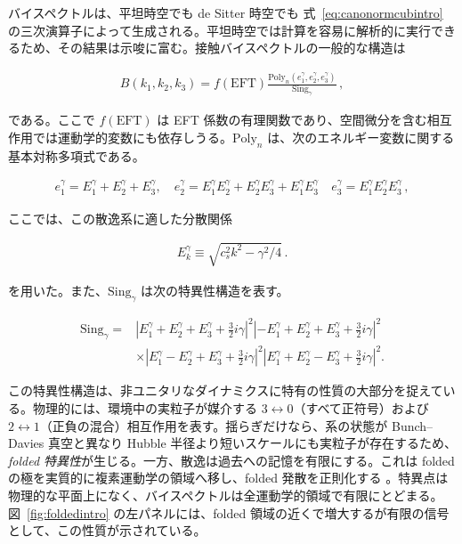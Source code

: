 \documentclass[a4paper,11pt]{ltjsarticle}
\numberwithin{equation}{section}
\newcommand{\Eq}[1]{Eq.~(\ref{#1})}
\newcommand{\Fig}[1]{Fig.~{\ref{#1}}}
\renewcommand{\Eq}[1]{式~\eqref{#1}}
\renewcommand{\Fig}[1]{図~\ref{#1}}
\begin{document}
バイスペクトルは、平坦時空でも de Sitter 時空でも \Eq{eq:canonormcubintro} の三次演算子によって生成される。平坦時空では計算を容易に解析的に実行できるため、その結果は示唆に富む。接触バイスペクトルの一般的な構造は

\begin{align}\label{eq:genintro}
B(k_1,k_2,k_3) =f(\mathrm{EFT}) \frac{  \mathrm{Poly}_n\left(e_1^\gamma, e_2^\gamma,e_3^\gamma \right)}{ \mathrm{Sing}_\gamma} \,,
\end{align}

である。ここで $f(\mathrm{EFT})$ は EFT 係数の有理関数であり、空間微分を含む相互作用では運動学的変数にも依存しうる。$\mathrm{Poly}_n$ は、次のエネルギー変数に関する基本対称多項式である。

\begin{align}\label{eq:varintro}
e_1^\gamma = E_1^{\gamma} + E_2^{\gamma} + E_3^{\gamma}, \quad e_2^\gamma = E_1^{\gamma} E_2^{\gamma} + E_2^{\gamma}  E_3^{\gamma} + E_1^{\gamma} E_3^{\gamma} \quad  e_3^\gamma = E_1^{\gamma} E_2^{\gamma} E_3^{\gamma}\,,
\end{align}

ここでは、この散逸系に適した分散関係

\begin{align}
E_k^{\gamma} \equiv \sqrt{c_s^2 k^2 - \gamma^2/4}\,.   
\end{align}

を用いた。また、$\mathrm{Sing}_\gamma$ は次の特異性構造を表す。

\begin{align}\label{eq:singdissipintro}
\mathrm{Sing}_\gamma =& \left| E_1^{\gamma} + E_2^{\gamma} + E_3^{\gamma} + \frac{3}{2}i \gamma\right|^2 \left| -E_1^{\gamma} + E_2^{\gamma} + E_3^{\gamma} + \frac{3}{2}i \gamma\right|^2 \nonumber\\
&\times \left| E_1^{\gamma} - E_2^{\gamma} + E_3^{\gamma} + \frac{3}{2}i \gamma\right|^2 \left| E_1^{\gamma} + E_2^{\gamma} - E_3^{\gamma} + \frac{3}{2}i \gamma\right|^2.
\end{align}

この特異性構造は、非ユニタリなダイナミクスに特有の性質の大部分を捉えている。物理的には、環境中の実粒子が媒介する $3\leftrightarrow0$（すべて正符号）および $2\leftrightarrow1$（正負の混合）相互作用を表す。揺らぎだけなら、系の状態が Bunch--Davies 真空と異なり Hubble 半径より短いスケールにも実粒子が存在するため、\textit{folded 特異性}が生じる。一方、散逸は過去への記憶を有限にする。これは folded の極を実質的に複素運動学の領域へ移し、folded 発散を正則化する \cite{LopezNacir:2011kk,Green:2020whw}。特異点は物理的な平面上になく、バイスペクトルは全運動学的領域で有限にとどまる。\Fig{fig:foldedintro} の左パネルには、folded 領域の近くで増大するが有限の信号として、この性質が示されている。
\end{document}

